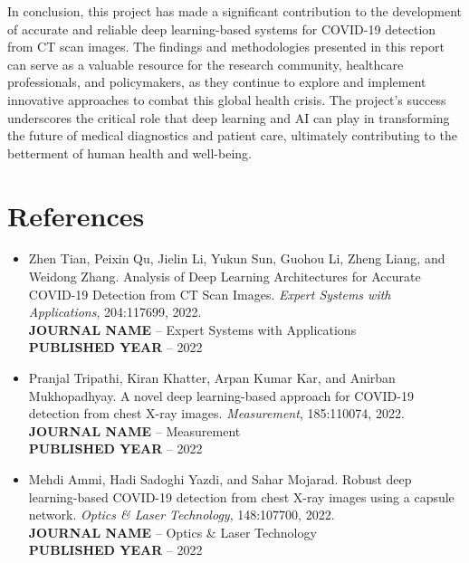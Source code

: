 \documentclass[12pt, a4paper]{report}
\begin{document}
In conclusion, this project has made a significant contribution to the development of accurate and reliable deep learning-based systems for COVID-19 detection from CT scan images. The findings and methodologies presented in this report can serve as a valuable resource for the research community, healthcare professionals, and policymakers, as they continue to explore
and implement innovative approaches to combat this global health crisis. The project's success underscores the critical role that deep learning and AI can play in transforming the future of medical diagnostics and patient care, ultimately contributing to the betterment of human health and well-being.

\chapter{References}
\begin{itemize}
    \item Zhen Tian, Peixin Qu, Jielin Li, Yukun Sun, Guohou Li, Zheng Liang, and Weidong Zhang. Analysis of Deep Learning Architectures for Accurate COVID-19 Detection from CT Scan Images. \textit{Expert Systems with Applications}, 204:117699, 2022. \\
    \textbf{JOURNAL NAME} -- Expert Systems with Applications \\
    \textbf{PUBLISHED YEAR} -- 2022
    \item Pranjal Tripathi, Kiran Khatter, Arpan Kumar Kar, and Anirban Mukhopadhyay. A novel deep learning-based approach for COVID-19 detection from chest X-ray images. \textit{Measurement}, 185:110074, 2022. \\
    \textbf{JOURNAL NAME} -- Measurement \\
    \textbf{PUBLISHED YEAR} -- 2022
    \item Mehdi Ammi, Hadi Sadoghi Yazdi, and Sahar Mojarad. Robust deep learning-based COVID-19 detection from chest X-ray images using a capsule network. \textit{Optics \& Laser Technology}, 148:107700, 2022. \\
    \textbf{JOURNAL NAME} -- Optics \& Laser Technology \\
    \textbf{PUBLISHED YEAR} -- 2022
\end{itemize}
\end{document}
